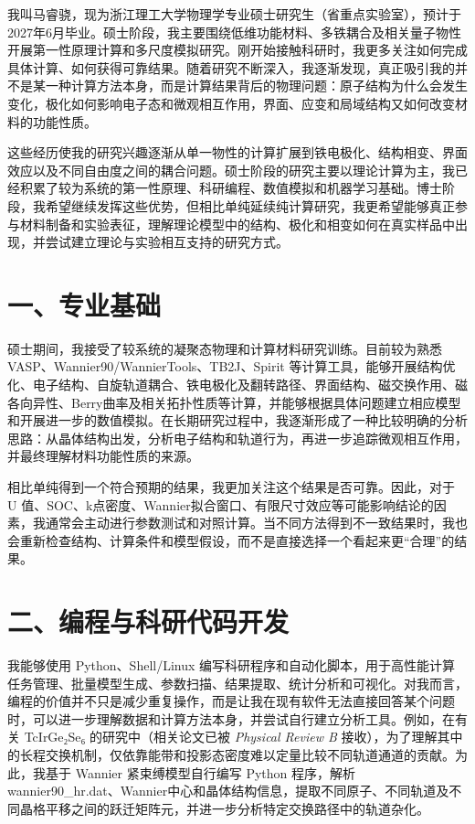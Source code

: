 我叫马睿骁，现为浙江理工大学物理学专业硕士研究生（省重点实验室），预计于2027年6月毕业。硕士阶段，我主要围绕低维功能材料、多铁耦合及相关量子物性开展第一性原理计算和多尺度模拟研究。刚开始接触科研时，我更多关注如何完成具体计算、如何获得可靠结果。随着研究不断深入，我逐渐发现，真正吸引我的并不是某一种计算方法本身，而是计算结果背后的物理问题：原子结构为什么会发生变化，极化如何影响电子态和微观相互作用，界面、应变和局域结构又如何改变材料的功能性质。

这些经历使我的研究兴趣逐渐从单一物性的计算扩展到铁电极化、结构相变、界面效应以及不同自由度之间的耦合问题。硕士阶段的研究主要以理论计算为主，我已经积累了较为系统的第一性原理、科研编程、数值模拟和机器学习基础。博士阶段，我希望继续发挥这些优势，但相比单纯延续纯计算研究，我更希望能够真正参与材料制备和实验表征，理解理论模型中的结构、极化和相变如何在真实样品中出现，并尝试建立理论与实验相互支持的研究方式。

\section{一、专业基础}

硕士期间，我接受了较系统的凝聚态物理和计算材料研究训练。目前较为熟悉 VASP、Wannier90/WannierTools、TB2J、Spirit 等计算工具，能够开展结构优化、电子结构、自旋轨道耦合、铁电极化及翻转路径、界面结构、磁交换作用、磁各向异性、Berry曲率及相关拓扑性质等计算，并能够根据具体问题建立相应模型和开展进一步的数值模拟。在长期研究过程中，我逐渐形成了一种比较明确的分析思路：从晶体结构出发，分析电子结构和轨道行为，再进一步追踪微观相互作用，并最终理解材料功能性质的来源。

相比单纯得到一个符合预期的结果，我更加关注这个结果是否可靠。因此，对于 U 值、SOC、k点密度、Wannier拟合窗口、有限尺寸效应等可能影响结论的因素，我通常会主动进行参数测试和对照计算。当不同方法得到不一致结果时，我也会重新检查结构、计算条件和模型假设，而不是直接选择一个看起来更“合理”的结果。

\section{二、编程与科研代码开发}

我能够使用 Python、Shell/Linux 编写科研程序和自动化脚本，用于高性能计算任务管理、批量模型生成、参数扫描、结果提取、统计分析和可视化。对我而言，编程的价值并不只是减少重复操作，而是让我在现有软件无法直接回答某个问题时，可以进一步理解数据和计算方法本身，并尝试自行建立分析工具。例如，在有关 TcIrGe₂Se₆ 的研究中（相关论文已被 \textit{Physical Review B} 接收），为了理解其中的长程交换机制，仅依靠能带和投影态密度难以定量比较不同轨道通道的贡献。为此，我基于 Wannier 紧束缚模型自行编写 Python 程序，解析 wannier90\_hr.dat、Wannier中心和晶体结构信息，提取不同原子、不同轨道及不同晶格平移之间的跃迁矩阵元，并进一步分析特定交换路径中的轨道杂化。

